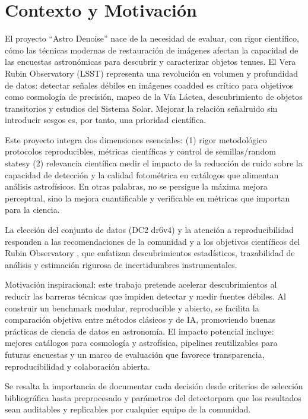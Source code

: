 \chapter{Contexto y Motivaci\'on}

El proyecto ``Astro Denoise'' nace de la necesidad de evaluar, con rigor cient\'ifico, c\'omo las t\'ecnicas modernas de restauraci\'on de im\'agenes afectan la capacidad de las encuestas astron\'omicas para descubrir y caracterizar objetos tenues. El Vera Rubin Observatory (LSST) representa una revoluci\'on en volumen y profundidad de datos: detectar señales d\'ebiles en im\'agenes coadded es cr\'itico para objetivos como cosmolog\'ia de precisi\'on, mapeo de la V\'ia L\'actea, descubrimiento de objetos transitorios y estudios del Sistema Solar. Mejorar la relaci\'on señal\textendash ruido sin introducir sesgos es, por tanto, una prioridad cient\'ifica.

Este proyecto integra dos dimensiones esenciales: (1) rigor metodol\'ogico \textemdash protocolos reproducibles, m\'etricas cient\'ificas y control de semillas/random states\textemdash y (2) relevancia cient\'ifica \textemdash medir el impacto de la reducci\'on de ruido sobre la capacidad de detecci\'on y la calidad fotom\'etrica en cat\'alogos que alimentan an\'alisis astrof\'isicos. En otras palabras, no se persigue la m\'axima mejora perceptual, sino la mejora cuantificable y verificable en m\'etricas que importan para la ciencia.

La elecci\'on del conjunto de datos (DC2 dr6\textendash v4) y la atenci\'on a reproducibilidad responden a las recomendaciones de la comunidad y a los objetivos cient\'ificos del Rubin Observatory \cite{objetivos_rubin_2024}, que enfatizan descubrimientos estad\'isticos, trazabilidad de an\'alisis y estimaci\'on rigurosa de incertidumbres instrumentales.

Motivaci\'on inspiracional: este trabajo pretende acelerar descubrimientos al reducir las barreras t\'ecnicas que impiden detectar y medir fuentes d\'ebiles. Al construir un benchmark modular, reproducible y abierto, se facilita la comparaci\'on objetiva entre m\'etodos cl\'asicos y de IA, promoviendo buenas pr\'acticas de ciencia de datos en astronom\'ia. El impacto potencial incluye: mejores cat\'alogos para cosmolog\'ia y astrof\'isica, pipelines reutilizables para futuras encuestas y un marco de evaluaci\'on que favorece transparencia, reproducibilidad y colaboraci\'on abierta.

Se resalta la importancia de documentar cada decisi\'on \textemdash desde criterios de selecci\'on bibliogr\'afica hasta preprocesado y par\'ametros del detector\textemdash para que los resultados sean auditables y replicables por cualquier equipo de la comunidad.

